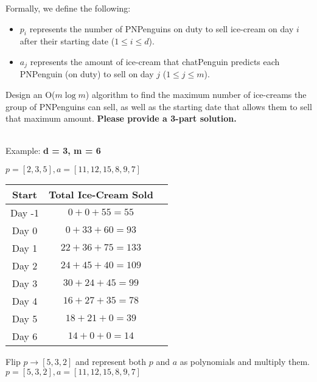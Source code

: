 \documentclass[11pt]{article}
\begin{document}
Formally, we define the following:
\begin{itemize}
    \item $p_i$ represents the number of PNPenguins on duty to sell ice-cream on day $i$ after their starting date ($1 \leq i \leq d$).
    \item $a_j$ represents the amount of ice-cream that chatPenguin predicts each PNPenguin (on duty) to sell on day $j$ ($1 \leq j \leq m$).
\end{itemize}
Design an O($m\log m$) algorithm to find the maximum number of ice-creams the group of PNPenguins can sell, as well as the starting date that allows them to sell that maximum amount. \textbf{Please provide a 3-part solution.}\\
\newpage
\begin{solution} \\
    \indent Example: \textbf{d = 3, m = 6}
    \begin{center}
        $p = [2, 3, 5], a = [11, 12, 15, 8, 9, 7]$
        \end{center}
        \begin{center}
            \begin{tabular}{|c|c|c|}
                \hline
                \rowcolor{blue!30}
                Start & Total Ice-Cream Sold\\
                \hline \hline
                Day -1 & $0+0+55 = 55$ \\
                Day 0 & $0+33+60 = 93$ \\
                \rowcolor{yellow}
                Day 1 & $22+36+75 = 133$ \\
                Day 2 & $24+45+40 = 109$ \\
                Day 3 & $30+24+45 = 99$ \\
                Day 4 & $16+27+35 = 78$ \\
                Day 5 & $18+21+0 = 39$ \\
                Day 6 & $14+0+0 = 14$ \\
                \hline
            \end{tabular}
        \end{center}
        \begin{center}
            Flip $p \rightarrow [5, 3, 2]$ and represent both $p$ and $a$ as polynomials and multiply them.\\
            $p = [5, 3, 2], a = [11, 12, 15, 8, 9, 7]$\\

\end{center}
\end{solution}
\end{document}
